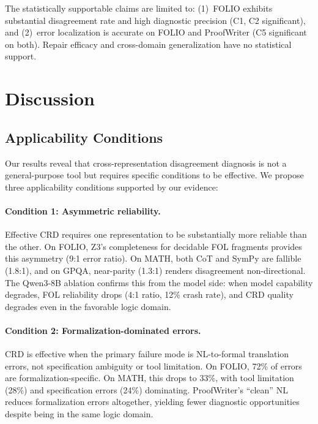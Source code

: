 \documentclass[11pt,a4paper]{article}
\begin{document}
The statistically supportable claims are limited to: (1)~FOLIO exhibits substantial disagreement rate and high diagnostic precision (C1, C2 significant), and (2)~error localization is accurate on FOLIO and ProofWriter (C5 significant on both). Repair efficacy and cross-domain generalization have no statistical support.

\section{Discussion}

\subsection{Applicability Conditions}

Our results reveal that cross-representation disagreement diagnosis is not a general-purpose tool but requires specific conditions to be effective. We propose three applicability conditions supported by our evidence:

\paragraph{Condition 1: Asymmetric reliability.}
Effective CRD requires one representation to be substantially more reliable than the other. On FOLIO, Z3's completeness for decidable FOL fragments provides this asymmetry (9:1 error ratio). On MATH, both CoT and SymPy are fallible (1.8:1), and on GPQA, near-parity (1.3:1) renders disagreement non-directional. The Qwen3-8B ablation confirms this from the model side: when model capability degrades, FOL reliability drops (4:1 ratio, 12\% crash rate), and CRD quality degrades even in the favorable logic domain.

\paragraph{Condition 2: Formalization-dominated errors.}
CRD is effective when the primary failure mode is NL-to-formal translation errors, not specification ambiguity or tool limitation. On FOLIO, 72\% of errors are formalization-specific. On MATH, this drops to 33\%, with tool limitation (28\%) and specification errors (24\%) dominating. ProofWriter's ``clean'' NL reduces formalization errors altogether, yielding fewer diagnostic opportunities despite being in the same logic domain.
\end{document}
